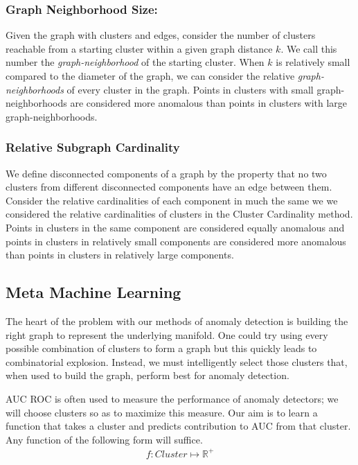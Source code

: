 \subsubsection{Graph Neighborhood Size:}
Given the graph with clusters and edges, consider the number of clusters reachable from a starting cluster within a given graph distance $k$.
We call this number the \textit{graph-neighborhood} of the starting cluster.
When $k$ is relatively small compared to the diameter of the graph, we can consider the relative \textit{graph-neighborhoods} of every cluster in the graph.
Points in clusters with small graph-neighborhoods are considered more anomalous than points in clusters with large graph-neighborhoods.

\subsubsection{Relative Subgraph Cardinality}
We define disconnected components of a graph by the property that no two clusters from different disconnected components have an edge between them.
Consider the relative cardinalities of each component in much the same we we considered the relative cardinalities of clusters in the Cluster Cardinality method.
Points in clusters in the same component are considered equally anomalous and points in clusters in relatively small components are considered more anomalous than points in clusters in relatively large components.



\subsection{Meta Machine Learning}
\label{subsec:methods:meta-machine-learning}
The heart of the problem with our methods of anomaly detection is building the right graph to represent the underlying manifold.
One could try using every possible combination of clusters to form a graph but this quickly leads to combinatorial explosion.
Instead, we must intelligently select those clusters that, when used to build the graph, perform best for anomaly detection.

AUC ROC is often used to measure the performance of anomaly detectors;
we will choose clusters so as to maximize this measure.
Our aim is to learn a function that takes a cluster and predicts contribution to AUC from that cluster.
Any function of the following form will suffice.
\begin{gather*}
    f: Cluster \mapsto \mathbb{R}^+
\end{gather*}

